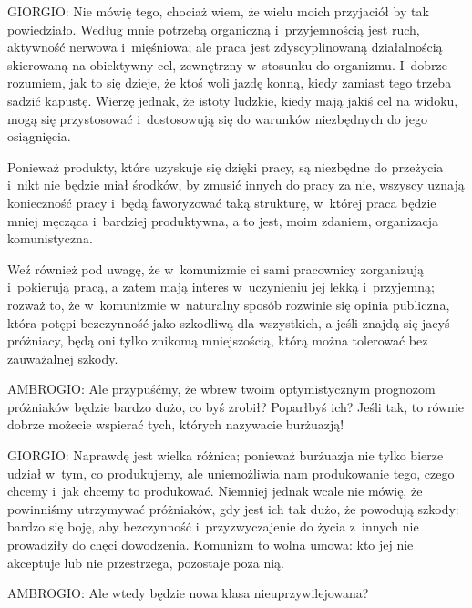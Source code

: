 \documentclass[oneside,polish,11pt,sfheadings]{mwbk}
\begin{document}
 
\noindent GIORGIO: Nie mówię tego, chociaż wiem, że wielu moich przyjaciół by tak powiedziało. Według mnie potrzebą organiczną i~przyjemnością jest ruch, aktywność nerwowa i~mięśniowa; ale praca jest zdyscyplinowaną działalnością skierowaną na
obiektywny cel, zewnętrzny w~stosunku do organizmu. I~dobrze rozumiem, jak to się dzieje, że ktoś woli jazdę konną,
kiedy zamiast tego trzeba sadzić kapustę. Wierzę jednak, że istoty ludzkie, kiedy mają jakiś cel na widoku, mogą się
przystosować i~dostosowują się do warunków niezbędnych do jego osiągnięcia. 

 
Ponieważ produkty, które uzyskuje się dzięki pracy, są niezbędne do przeżycia i~nikt nie będzie miał środków, by zmusić
innych do pracy za nie, wszyscy uznają konieczność pracy i~będą faworyzować taką strukturę, w~której praca będzie mniej
męcząca i~bardziej produktywna, a to jest, moim zdaniem, organizacja komunistyczna. 

 
Weź również pod uwagę, że w~komunizmie ci sami pracownicy zorganizują i~pokierują pracą, a zatem mają interes w~uczynieniu jej lekką i~przyjemną; rozważ to, że w~komunizmie w~naturalny sposób rozwinie się opinia publiczna, która
potępi bezczynność jako szkodliwą dla wszystkich, a jeśli znajdą się jacyś próżniacy, będą oni tylko znikomą
mniejszością, którą można tolerować bez zauważalnej szkody. 




 
\noindent AMBROGIO: Ale przypuśćmy, że wbrew twoim optymistycznym prognozom próżniaków będzie bardzo dużo, co byś zrobił?
Poparłbyś ich? Jeśli tak, to równie dobrze możecie wspierać tych, których nazywacie burżuazją! 




 
\noindent GIORGIO: Naprawdę jest wielka różnica; ponieważ burżuazja nie tylko bierze udział w~tym, co produkujemy, ale
uniemożliwia nam produkowanie tego, czego chcemy i~jak chcemy to produkować. Niemniej jednak wcale nie mówię, że
powinniśmy utrzymywać próżniaków, gdy jest ich tak dużo, że powodują szkody: bardzo się boję, aby bezczynność i~przyzwyczajenie do życia z~innych nie prowadziły do chęci dowodzenia. Komunizm to wolna umowa: kto jej nie akceptuje
lub nie przestrzega, pozostaje poza nią. 




 
\noindent AMBROGIO: Ale wtedy będzie nowa klasa nieuprzywilejowana? 
\end{document}
